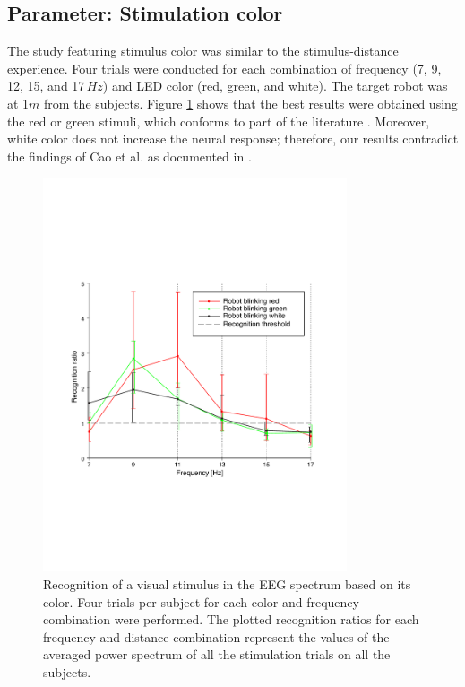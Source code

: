 \documentclass[smallextended]{svjour3}
\begin{document}
\subsection{Parameter: Stimulation color}
The study featuring stimulus color was similar to the stimulus-distance experience. Four trials were conducted for each combination of frequency (7, 9, 12, 15, and 17\,$Hz$) and LED color (red, green, and white). The target robot was at 1$m$ from the subjects. Figure \ref{fig:graph-couleurs} shows that the best results were obtained using the red or green stimuli, which conforms to part of the literature \cite{chua2004effects,duvinage2013performance,paper_5,hvaring2014comparison}. Moreover, white color does not increase the neural response; therefore, our results contradict the findings of Cao et al. as documented in \cite{cao2012flashing}. 

\begin{figure}
\center
\includegraphics[width=0.8\textwidth]{figures/graph-couleurs.pdf}
\caption{Recognition of a visual stimulus in the EEG spectrum based on its color. Four trials per subject for each color and frequency combination were performed. The plotted recognition ratios for each frequency and distance combination represent the values of the averaged power spectrum of all the stimulation trials on all the subjects.} \label{fig:graph-couleurs}
\end{figure}
\end{document}
